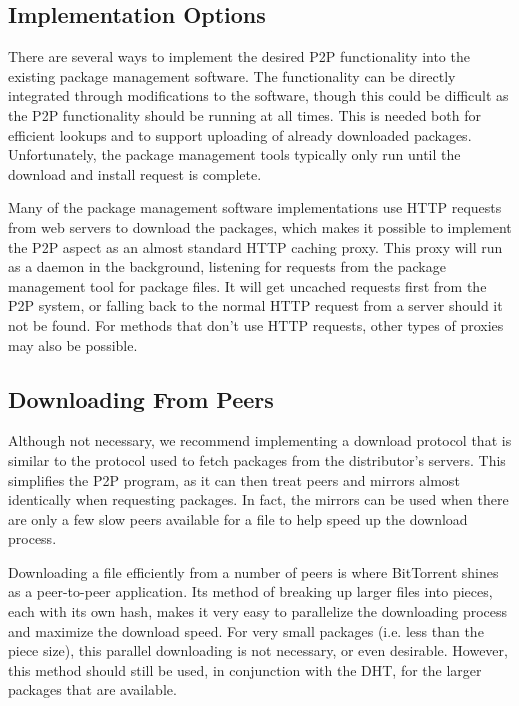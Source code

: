 \documentclass[conference]{IEEEtran}
\begin{document}
\subsection{Implementation Options}
\label{imp_options}

There are several ways to implement the desired P2P functionality
into the existing package management software. The functionality can
be directly integrated through modifications to the software, though
this could be difficult as the P2P functionality should be running
at all times. This is needed both for efficient lookups and to
support uploading of already downloaded packages. Unfortunately, the
package management tools typically only run until the download and
install request is complete.

Many of the package management software implementations use HTTP
requests from web servers to download the packages, which makes it
possible to implement the P2P aspect as an almost standard HTTP
caching proxy. This proxy will run as a daemon in the background,
listening for requests from the package management tool for package
files. It will get uncached requests first from the P2P system, or
falling back to the normal HTTP request from a server should it not
be found. For methods that don't use HTTP requests, other types of
proxies may also be possible.

\subsection{Downloading From Peers}
\label{downloading}

Although not necessary, we recommend implementing a download
protocol that is similar to the protocol used to fetch packages from
the distributor's servers. This simplifies the P2P program, as it
can then treat peers and mirrors almost identically when requesting
packages. In fact, the mirrors can be used when there are only a few
slow peers available for a file to help speed up the download
process.

Downloading a file efficiently from a number of peers is where
BitTorrent shines as a peer-to-peer application. Its method of
breaking up larger files into pieces, each with its own hash,
makes it very easy to parallelize the downloading process and
maximize the download speed. For very small packages (i.e. less than
the piece size), this parallel downloading is not necessary, or
even desirable. However, this method should still be used, in
conjunction with the DHT, for the larger packages that are
available.
\end{document}

